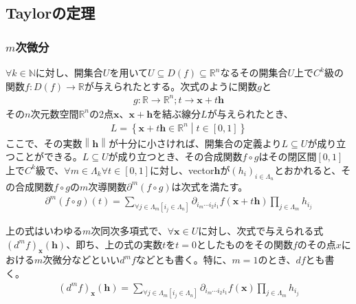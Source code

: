 \documentclass[dvipdfmx]{jsarticle}
\begin{document}
\subsection{Taylorの定理}%
\subsubsection{$m$次微分}%
\begin{thm}\label{4.2.7.1}
$\forall k \in \mathbb{N}$に対し、開集合$U$を用いて$U \subseteq D(f) \subseteq \mathbb{R}^{n}$なるその開集合$U$上で$C^{k}$級の関数$f:D(f) \rightarrow \mathbb{R}$が与えられたとする。次式のように関数$g$と
\begin{align*}
g:\mathbb{R} \rightarrow \mathbb{R}^{n};t \rightarrow \mathbf{x} + t\mathbf{h}
\end{align*}
その$n$次元数空間$\mathbb{R}^{n}$の2点$\mathbf{x}$、$\mathbf{x} + \mathbf{h}$を結ぶ線分$L$が与えられたとき、
\begin{align*}
L = \left\{ \mathbf{x} + t\mathbf{h} \in \mathbb{R}^{n} \middle| t \in [ 0,1] \right\}
\end{align*}
ここで、その実数$\left\| \mathbf{h} \right\|$が十分に小さければ、開集合の定義より$L \subseteq U$が成り立つことができる。$L \subseteq U$が成り立つとき、その合成関数$f \circ g$はその閉区間$[ 0,1]$上で$C^{k}$級で、$\forall m \in \varLambda_{k}\forall t \in [ 0,1]$に対し、vector$\mathbf{h}$が$\left( h_{i} \right)_{i \in \varLambda_{n}}$とおかれると、その合成関数$f \circ g$の$m$次導関数$\partial^{m}(f \circ g)$は次式を満たす。
\begin{align*}
\partial^{m}(f \circ g)(t) = \sum_{\forall j \in \varLambda_{m}\left[ i_{j} \in \varLambda_{n} \right]} {\partial_{i_{m}\cdots i_{2}i_{1}}f\left( \mathbf{x} + t\mathbf{h} \right)\prod_{j \in \varLambda_{m}} h_{i_{j}}}
\end{align*}
\end{thm}
\begin{dfn}
上の式はいわゆる$m$次同次多項式で、$\forall\mathbf{x} \in U$に対し、次式で与えられる式$\left( d^{m}f \right)_{\mathbf{x}}\left( \mathbf{h} \right)$、即ち、上の式の実数$t$を$t = 0$としたものをその関数$f$のその点$x$における$m$次微分などといい$d^{m}f$などとも書く。特に、$m = 1$のとき、$df$とも書く。
\begin{align*}
\left( d^{m}f \right)_{\mathbf{x}}\left( \mathbf{h} \right) = \sum_{\forall j \in \varLambda_{m}\left[ i_{j} \in \varLambda_{n} \right]} {\partial_{i_{m}\cdots i_{2}i_{1}}f\left( \mathbf{x} \right)\prod_{j \in \varLambda_{m}} h_{i_{j}}}
\end{align*}
\end{dfn}\par
\end{document}
